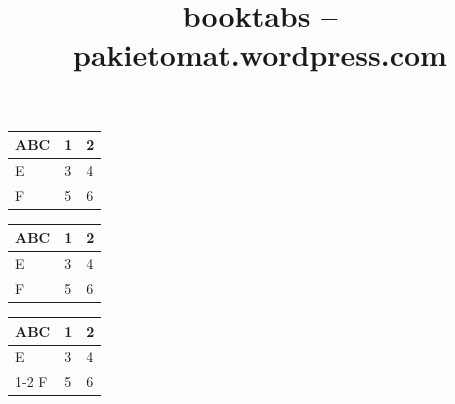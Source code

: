 \documentclass{article}
\title{booktabs -- pakietomat.wordpress.com}
\author{}
\date{\relax}
\begin{document}
\begin{tabular}{lll} \hline
ABC & 1 & 2 \\ \hline
E & 3 & 4 \\ \hline
F & 5 & 6 \\ \hline
\end{tabular}

\bigskip

\begin{tabular}{lll} \toprule
ABC & 1 & 2 \\ \midrule
E & 3 & 4 \\
F & 5 & 6 \\ \bottomrule
\end{tabular}

\bigskip

\begin{tabular}{lll} \toprule
ABC & 1 & 2 \\ \midrule
E & 3 & 4 \\ \cmidrule{1-2}
F & 5 & 6 \\ \bottomrule
\end{tabular}
\end{document}
